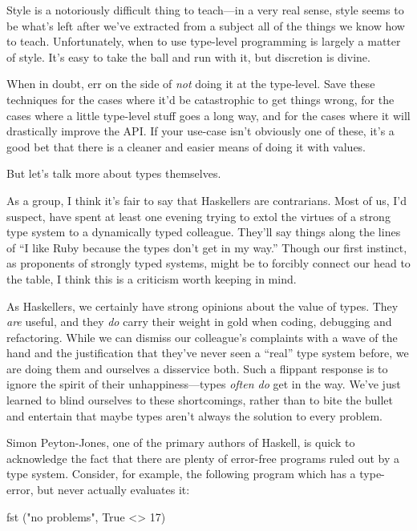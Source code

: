 \documentclass[book.tex]{subfiles}
\begin{document}
Style is a notoriously difficult thing to teach---in a very real sense, style
seems to be what's left after we've extracted from a subject all of the things
we know how to teach. Unfortunately, when to use type-level programming is
largely a matter of style. It's easy to take the ball and run with it, but
discretion is divine.

When in doubt, err on the side of \emph{not} doing it at the type-level. Save
these techniques for the cases where it'd be catastrophic to get things wrong,
for the cases where a little type-level stuff goes a long way, and for the cases
where it will drastically improve the API. If your use-case isn't obviously one
of these, it's a good bet that there is a cleaner and easier means of doing it
with values.

But let's talk more about types themselves.

As a group, I think it's fair to say that Haskellers are contrarians. Most of
us, I'd suspect, have spent at least one evening trying to extol the virtues of
a strong type system to a dynamically typed colleague. They'll say things along
the lines of ``I like Ruby because the types don't get in my way.'' Though our
first instinct, as proponents of strongly typed systems, might be to forcibly
connect our head to the table, I think this is a criticism worth keeping in
mind.

As Haskellers, we certainly have strong opinions about the value of types. They
\emph{are} useful, and they \emph{do} carry their weight in gold when coding,
debugging and refactoring. While we can dismiss our colleague's complaints with
a wave of the hand and the justification that they've never seen a ``real'' type
system before, we are doing them and ourselves a disservice both. Such a
flippant response is to ignore the spirit of their unhappiness---types
\emph{often do} get in the way.  We've just learned to blind ourselves to these
shortcomings, rather than to bite the bullet and entertain that maybe types
aren't always the solution to every problem.

Simon Peyton-Jones, one of the primary authors of Haskell, is quick to
acknowledge the fact that there are plenty of error-free programs ruled out by a
type system. Consider, for example, the following program which has a
type-error, but never actually evaluates it:

\begin{code}
fst ("no problems", True <> 17)
\end{code}
\end{document}
